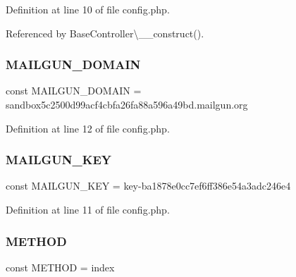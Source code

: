 Definition at line 10 of file config.\+php.



Referenced by Base\+Controller\textbackslash{}\+\_\+\+\_\+construct().

\hypertarget{config_8php_a2de069ac064bb137af53d99e3fcff3c8}{}\label{config_8php_a2de069ac064bb137af53d99e3fcff3c8} 
\subsubsection{\texorpdfstring{M\+A\+I\+L\+G\+U\+N\+\_\+\+D\+O\+M\+A\+IN}{MAILGUN\_DOMAIN}}
{\footnotesize\ttfamily const M\+A\+I\+L\+G\+U\+N\+\_\+\+D\+O\+M\+A\+IN = \textquotesingle{}sandbox5c2500d99acf4cbfa26fa88a596a49bd.\+mailgun.\+org\textquotesingle{}}



Definition at line 12 of file config.\+php.

\hypertarget{config_8php_ad320bd8d96c22e094fb9b774f269aaef}{}\label{config_8php_ad320bd8d96c22e094fb9b774f269aaef} 
\subsubsection{\texorpdfstring{M\+A\+I\+L\+G\+U\+N\+\_\+\+K\+EY}{MAILGUN\_KEY}}
{\footnotesize\ttfamily const M\+A\+I\+L\+G\+U\+N\+\_\+\+K\+EY = \textquotesingle{}key-\/ba1878e0cc7ef6ff386e54a3adc246e4\textquotesingle{}}



Definition at line 11 of file config.\+php.

\hypertarget{config_8php_a9d70943cac2f50debb62d2008a6e768d}{}\label{config_8php_a9d70943cac2f50debb62d2008a6e768d} 
\subsubsection{\texorpdfstring{M\+E\+T\+H\+OD}{METHOD}}
{\footnotesize\ttfamily const M\+E\+T\+H\+OD = \textquotesingle{}index\textquotesingle{}}



